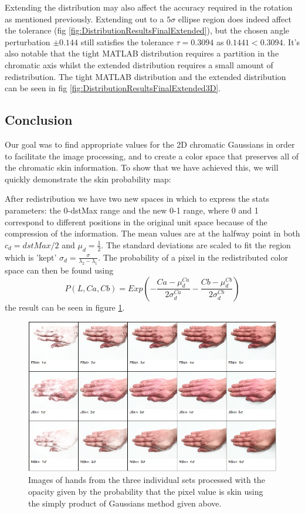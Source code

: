 Extending the distribution may also affect the accuracy required in the rotation as mentioned previously. Extending out to a $5\sigma$ ellipse region does indeed affect the tolerance (fig \ref{fig:DistributionResultsFinalExtended}), but the chosen angle perturbation $\pm0.144$ still satisfies the tolerance $\tau = 0.3094$ as $0.1441 < 0.3094$. It's also notable that the tight MATLAB distribution requires a  partition in the chromatic axis whilst the extended distribution requires a small amount of redistribution. The tight MATLAB distribution and the extended distribution can be seen in fig \ref{fig:DistributionResultsFinalExtended3D}.

\subsection{Conclusion}

Our goal was to find appropriate values for the 2D chromatic Gaussians in order to facilitate the image processing, and to create a color space that preserves all of the chromatic skin information. To show that we have achieved this, we will quickly demonstrate the skin probability map:

After redistribution we have two new spaces in which to express the stats parameters: the 0-dstMax range and the new 0-1 range, where 0 and 1 correspond to different positions in the original unit space because of the compression of the information. The mean values are at the halfway point in both $c_d=dstMax/2$ and $\mu_d = \frac{1}{2}$.  The standard deviations are scaled to fit the region which is 'kept' $\sigma_d=\frac{\sigma}{\lambda_2-\lambda_1}$. The probability of a pixel in the redistributed color space can then be found using 
\begin{equation}
P(L,Ca,Cb) = Exp(- \frac{Ca-\mu_d^{Ca} }{2 \sigma_d^{Ca}} - \frac{Cb-\mu_d^{Cb} }{2 \sigma_d^{Cb}})
\end{equation}
the result can be seen in figure \ref{fig:TransformImages}.
\begin{figure}[h!]
  \centering
  \includegraphics[width=0.95 \textwidth]{Chapter3/Figs/TransformImages.jpg} 
    \caption{ Images of hands from the three individual sets processed with the opacity given by the probability that the pixel value is skin using the simply product of Gaussians method given above.}  \label{fig:TransformImages}
\end{figure}

